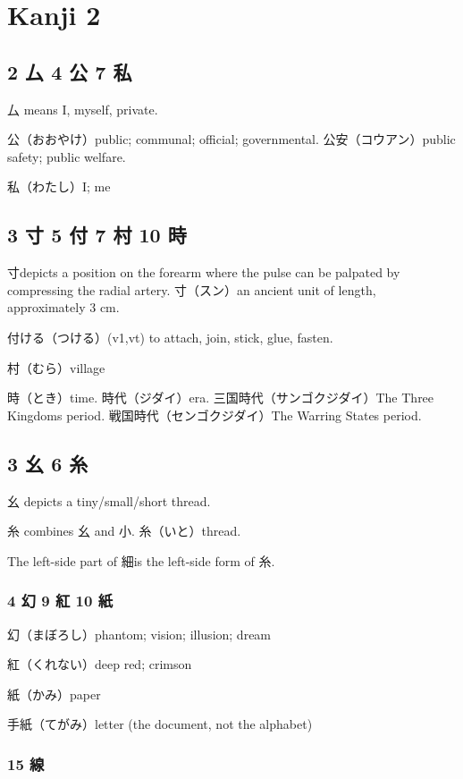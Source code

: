 \chapter{Kanji 2}

\section{2 厶 4 公 7 私}

厶 means I, myself, private.

公（おおやけ）public; communal; official; governmental.
公安（コウアン）public safety; public welfare.

私（わたし）I; me

\section{3 寸 5 付 7 村 10 時}

寸depicts a position on the forearm
where the pulse can be palpated by compressing the radial artery.
寸（スン）an ancient unit of length, approximately 3 cm.

付ける（つける）(v1,vt) to attach, join, stick, glue, fasten.

村（むら）village

時（とき）time.
時代（ジダイ）era.
三国時代（サンゴクジダイ）The Three Kingdoms period.
戦国時代（センゴクジダイ）The Warring States period.

\section{3 幺 6 糸}

幺 depicts a tiny/small/short thread.

糸 combines 幺 and 小.
糸（いと）thread.

The left-side part of 細is the left-side form of 糸.

\subsection{4 幻 9 紅 10 紙}

幻（まぼろし）phantom; vision; illusion; dream

紅（くれない）deep red; crimson

紙（かみ）paper

手紙（てがみ）letter (the document, not the alphabet)

\subsection{15 線}

